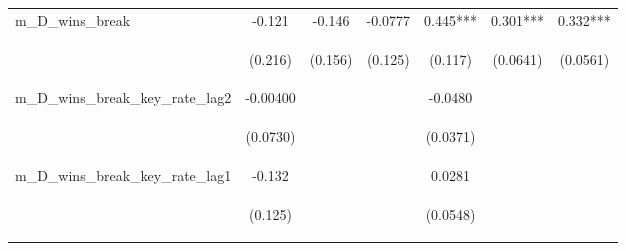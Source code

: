 \documentclass[]{article}
\begin{document}
\begin{center}
\begin{tabular}{lcccccc}
m\_D\_wins\_break & -0.121 & -0.146 & -0.0777 & 0.445*** & 0.301*** & 0.332*** \\
\vspace{4pt} & \begin{footnotesize}(0.216)\end{footnotesize} & \begin{footnotesize}(0.156)\end{footnotesize} & \begin{footnotesize}(0.125)\end{footnotesize} & \begin{footnotesize}(0.117)\end{footnotesize} & \begin{footnotesize}(0.0641)\end{footnotesize} & \begin{footnotesize}(0.0561)\end{footnotesize} \\
m\_D\_wins\_break\_key\_rate\_lag2 & -0.00400 &  &  & -0.0480 &  &  \\
\vspace{4pt} & \begin{footnotesize}(0.0730)\end{footnotesize} & \begin{footnotesize}\end{footnotesize} & \begin{footnotesize}\end{footnotesize} & \begin{footnotesize}(0.0371)\end{footnotesize} & \begin{footnotesize}\end{footnotesize} & \begin{footnotesize}\end{footnotesize} \\
m\_D\_wins\_break\_key\_rate\_lag1 & -0.132 &  &  & 0.0281 &  &  \\
\vspace{4pt} & \begin{footnotesize}(0.125)\end{footnotesize} & \begin{footnotesize}\end{footnotesize} & \begin{footnotesize}\end{footnotesize} & \begin{footnotesize}(0.0548)\end{footnotesize} & \begin{footnotesize}\end{footnotesize} & \begin{footnotesize}\end{footnotesize} \\

\end{tabular}
\end{center}
\end{document}
